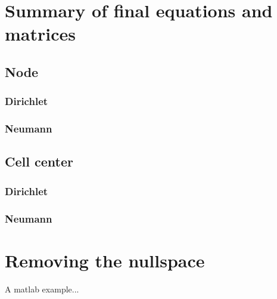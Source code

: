 \documentclass[landscape]{article}
\begin{document}
\section{Summary of final equations and matrices}
\subsection{Node}
\subsubsection{Dirichlet}
\subsubsection{Neumann}
\subsection{Cell center}
\subsubsection{Dirichlet}
\subsubsection{Neumann}

\newpage
\section{Removing the nullspace}
A matlab example...
\end{document}
